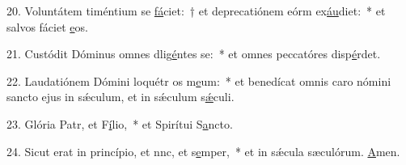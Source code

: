 20. Voluntátem timéntium se \uline{fá}ciet:~† et deprecatiónem eórm ex\uline{áu}diet:~* et salvos fáciet \uline{e}os.\par 
21. Custódit Dóminus omnes dlig\uline{é}ntes se:~* et omnes peccatóres disp\uline{é}rdet.\par 
22. Laudatiónem Dómini loquétr os m\uline{e}um:~* et benedícat omnis caro nómini sancto ejus in sǽculum, et in sǽculum s\uline{ǽ}culi.\par 
23. Glória Patr, et F\uline{í}lio,~* et Spirítui S\uline{a}ncto.\par 
24. Sicut erat in princípio, et nnc, et s\uline{e}mper,~* et in sǽcula sæculórum. \uline{A}men.\par 
